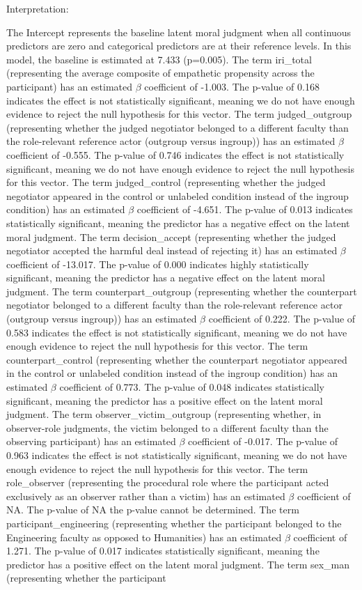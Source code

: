 \documentclass[11pt]{article}
\begin{document}
Interpretation:

The Intercept represents the baseline latent moral judgment when all continuous predictors are zero and categorical predictors are at their reference levels. In this model, the baseline is estimated at 7.433 (p=0.005). The term iri\_total (representing the average composite of empathetic propensity across the participant) has an estimated $\beta$ coefficient of -1.003. The p-value of 0.168 indicates the effect is not statistically significant, meaning we do not have enough evidence to reject the null hypothesis for this vector. The term judged\_outgroup (representing whether the judged negotiator belonged to a different faculty than the role-relevant reference actor (outgroup versus ingroup)) has an estimated $\beta$ coefficient of -0.555. The p-value of 0.746 indicates the effect is not statistically significant, meaning we do not have enough evidence to reject the null hypothesis for this vector. The term judged\_control (representing whether the judged negotiator appeared in the control or unlabeled condition instead of the ingroup condition) has an estimated $\beta$ coefficient of -4.651. The p-value of 0.013 indicates statistically significant, meaning the predictor has a negative effect on the latent moral judgment. The term decision\_accept (representing whether the judged negotiator accepted the harmful deal instead of rejecting it) has an estimated $\beta$ coefficient of -13.017. The p-value of 0.000 indicates highly statistically significant, meaning the predictor has a negative effect on the latent moral judgment. The term counterpart\_outgroup (representing whether the counterpart negotiator belonged to a different faculty than the role-relevant reference actor (outgroup versus ingroup)) has an estimated $\beta$ coefficient of 0.222. The p-value of 0.583 indicates the effect is not statistically significant, meaning we do not have enough evidence to reject the null hypothesis for this vector. The term counterpart\_control (representing whether the counterpart negotiator appeared in the control or unlabeled condition instead of the ingroup condition) has an estimated $\beta$ coefficient of 0.773. The p-value of 0.048 indicates statistically significant, meaning the predictor has a positive effect on the latent moral judgment. The term observer\_victim\_outgroup (representing whether, in observer-role judgments, the victim belonged to a different faculty than the observing participant) has an estimated $\beta$ coefficient of -0.017. The p-value of 0.963 indicates the effect is not statistically significant, meaning we do not have enough evidence to reject the null hypothesis for this vector. The term role\_observer (representing the procedural role where the participant acted exclusively as an observer rather than a victim) has an estimated $\beta$ coefficient of NA. The p-value of NA the p-value cannot be determined. The term participant\_engineering (representing whether the participant belonged to the Engineering faculty as opposed to Humanities) has an estimated $\beta$ coefficient of 1.271. The p-value of 0.017 indicates statistically significant, meaning the predictor has a positive effect on the latent moral judgment. The term sex\_man (representing whether the participant 
\end{document}
